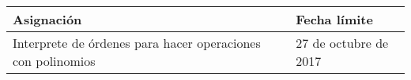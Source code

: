 \documentclass{article}
\begin{document}
\begin{center}
\begin{tabular}{|p{2.0in}|p{2.0in}|}
\hline
{\bf Asignaci\'on} & {\bf Fecha l\'imite}		\\ \hline
Interprete de \'ordenes para hacer operaciones		     con polinomios &
27 de octubre de 2017\\ \hline
\end{tabular}
\end{center}
\end{document}
